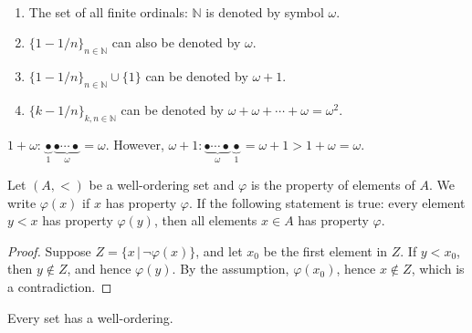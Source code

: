 \medskip

\begin{example}
~\begin{enumerate}[label=(\alph*)]
    \item The set of all finite ordinals: $\mathbb{N}$ is denoted by symbol $\omega$.
    
    \item $\{1 - 1/n\}_{n \in \mathbb{N}}$ can also be denoted by $\omega$.
    
    \item $\{1 - 1/n\}_{n \in \mathbb{N}} \cup \{1\}$ can be denoted by $\omega + 1$.
    
    \item $\{k - 1/n\}_{k,n \in \mathbb{N}}$ can be denoted by $\omega + \omega + \cdots + \omega = \omega^2$.
\end{enumerate}
\end{example}

\medskip

\begin{remark}
$1 + \omega: \underbrace{\bullet}_{1} \underbrace{\bullet \cdots \bullet}_{\omega} = \omega$. However, $\omega + 1: \underbrace{\bullet \cdots \bullet}_{\omega}  \underbrace{\bullet}_{1} = \omega + 1 > 1 + \omega = \omega$.
\end{remark}

\medskip

\begin{theorem}
Let $(A,<)$ be a well-ordering set and $\varphi$ is the property of elements of $A$. We write $\varphi(x)$ if $x$ has property $\varphi$. If the following statement is true: every element $y < x$ has property $\varphi(y)$, then all elements $x \in A$ has property $\varphi$.
\end{theorem}
\begin{proof}
Suppose $Z = \{x \, |\, \neg \varphi(x)\}$, and let $x_0$ be the first element in $Z$. If $y < x_0$, then $y \notin Z$, and hence $\varphi(y)$. By the assumption, $\varphi(x_0)$, hence $x \notin Z$, which is a contradiction.
\end{proof}

\medskip

\begin{theorem}
Every set has a well-ordering.
\end{theorem}

\medskip